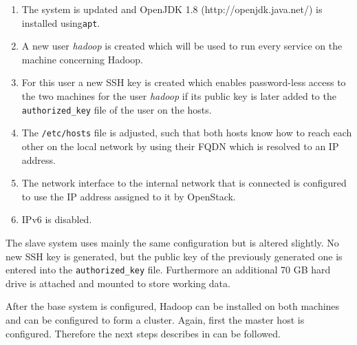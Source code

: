 \begin{enumerate}
    \item The system is updated and OpenJDK 1.8 (http://openjdk.java.net/)  is installed using\texttt{apt}. 
    \item A new user \emph{hadoop} is created which will be used to run every service on the machine concerning Hadoop.
    \item For this user a new \ac{SSH} key is created which enables password-less access to the two machines for the user \emph{hadoop} if its public key is later added to the \texttt{authorized\_key} file of the user on the hosts.
    \item The \texttt{/etc/hosts} file is adjusted, such that both hosts know how to reach each other on the local network by using their \acs{FQDN} which is resolved to an \ac{IP} address.
    \item The network interface to the internal network that is connected is configured to use the \ac{IP} address assigned to it by OpenStack.
    \item \ac{IP}v6 is disabled.
\end{enumerate}

The slave system uses mainly the same configuration but is altered slightly.
No new \ac{SSH} key is generated, but the public key of the previously
generated one is entered into the \texttt{authorized\_key} file. 
Furthermore an additional 70 \ac{GB} hard drive is attached 
and mounted to store working data.

After the base system is configured, Hadoop can be installed on both machines
and can be configured to form a cluster.
Again, first the master host is configured.
Therefore the next steps describes in 
\autocite[][Appendix A]{white2015hadoop}
can be followed.

